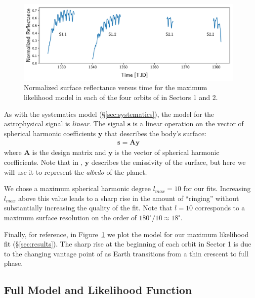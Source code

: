 \documentclass[modern]{aastex62}
\begin{document}
\begin{figure}[t!]
    \begin{centering}
    \includegraphics[width=\linewidth]{figures/starry_model.pdf}
    \caption{\label{fig:starry_model}
             Normalized surface reflectance versus time for the maximum
             likelihood \starry model in each of the four orbits of \TESS
             in Sectors 1 and 2.
             }
    \end{centering}
\end{figure}

As with the systematics model (\S\ref{sec:systematics}), the model
for the astrophysical signal is \emph{linear}. The signal $\mathbf{s}$ 
is a linear operation on the vector of spherical harmonic coefficients 
$\mathbf{y}$
that describes the body's surface:
%
\begin{align}
    \mathbf{s} = \mathbf{A} \mathbf{y}
\end{align}
%
where $\mathbf{A}$ is the design matrix and $\mathbf{y}$ is the vector of spherical harmonic coefficients. 
Note that in \cite{Luger2019}, $\mathbf{y}$ describes the emissivity of the surface,
but here we will use it to represent the \emph{albedo} of the planet.

We chose a maximum spherical harmonic degree $l_{max} = 10$ for our fits.
Increasing $l_{max}$ above this value 
leads to a sharp rise in the amount of ``ringing'' without substantially
increasing the quality of the fit. Note that $l = 10$ corresponds to
a maximum surface resolution on the order of $180^\circ/10 \approx 18^\circ$.

Finally, for reference, in Figure~\ref{fig:starry_model} we plot the
\starry model for our maximum likelihood fit (\S\ref{sec:results}). The
sharp rise at the beginning of each orbit in Sector 1 is due to the changing
vantage point of \TESS as Earth transitions from a thin crescent to full phase.

\subsection{Full Model and Likelihood Function}
\label{sec:model}
\end{document}
